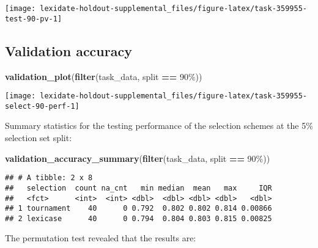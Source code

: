 \documentclass[
]{book}
\newenvironment{Shaded}{\begin{snugshade}}{\end{snugshade}}
\newcommand{\FunctionTok}[1]{\textcolor[rgb]{0.13,0.29,0.53}{\textbf{#1}}}
\newcommand{\NormalTok}[1]{#1}
\newcommand{\SpecialCharTok}[1]{\textcolor[rgb]{0.81,0.36,0.00}{\textbf{#1}}}
\newcommand{\StringTok}[1]{\textcolor[rgb]{0.31,0.60,0.02}{#1}}
\begin{document}
\texttt{[image: lexidate-holdout-supplemental\_files/figure-latex/task-359955-test-90-pv-1]}

\hypertarget{validation-accuracy-13}{%
\subsection{Validation accuracy}\label{validation-accuracy-13}}

\begin{Shaded}
\begin{Highlighting}[]
\FunctionTok{validation\_plot}\NormalTok{(}\FunctionTok{filter}\NormalTok{(task\_data, split }\SpecialCharTok{==} \StringTok{\textquotesingle{}90\%\textquotesingle{}}\NormalTok{))}
\end{Highlighting}
\end{Shaded}

\texttt{[image: lexidate-holdout-supplemental\_files/figure-latex/task-359955-select-90-perf-1]}

Summary statistics for the testing performance of the selection schemes at the 5\% selection set split:

\begin{Shaded}
\begin{Highlighting}[]
\FunctionTok{validation\_accuracy\_summary}\NormalTok{(}\FunctionTok{filter}\NormalTok{(task\_data, split }\SpecialCharTok{==} \StringTok{\textquotesingle{}90\%\textquotesingle{}}\NormalTok{))}
\end{Highlighting}
\end{Shaded}

\begin{verbatim}
## # A tibble: 2 x 8
##   selection  count na_cnt   min median  mean   max     IQR
##   <fct>      <int>  <int> <dbl>  <dbl> <dbl> <dbl>   <dbl>
## 1 tournament    40      0 0.792  0.802 0.802 0.814 0.00866
## 2 lexicase      40      0 0.794  0.804 0.803 0.815 0.00825
\end{verbatim}

The permutation test revealed that the results are:
\end{document}

